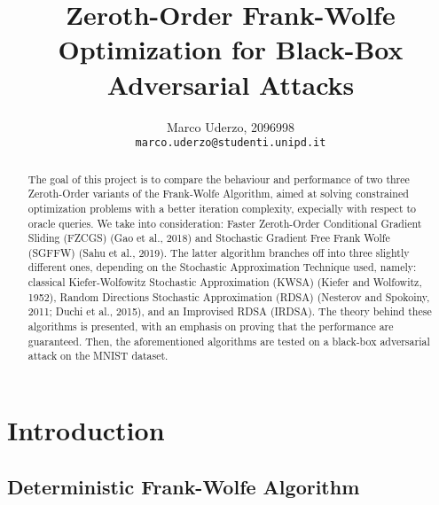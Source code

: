 \documentclass[10pt,twocolumn,letterpaper]{article}
\begin{document}
\title{Zeroth-Order Frank-Wolfe Optimization for Black-Box Adversarial Attacks}

\author{Marco Uderzo, 2096998\\
{\tt\small marco.uderzo@studenti.unipd.it}
}

\maketitle

\begin{abstract}
   The goal of this project is to compare the behaviour and performance
   of two three Zeroth-Order variants of the Frank-Wolfe Algorithm, aimed at 
   solving constrained optimization problems with a better iteration complexity,
   expecially with respect to oracle queries.
   We take into consideration: Faster Zeroth-Order Conditional Gradient Sliding (FZCGS)
   (Gao et al., 2018) and Stochastic Gradient Free Frank Wolfe 
   (SGFFW) (Sahu et al., 2019). The latter algorithm branches off into three slightly different ones,
   depending on the Stochastic Approximation Technique used, namely: classical Kiefer-Wolfowitz
   Stochastic Approximation (KWSA) (Kiefer and Wolfowitz, 1952), Random Directions Stochastic Approximation
   (RDSA) (Nesterov and Spokoiny, 2011; Duchi et al., 2015), and an Improvised RDSA (IRDSA). 
   The theory behind these algorithms is presented, with an emphasis on proving that the performance are guaranteed. 
   Then, the aforementioned algorithms are tested on a black-box adversarial attack on the MNIST dataset. 

\end{abstract}

\section{Introduction}



\subsection{Deterministic Frank-Wolfe Algorithm}
\end{document}

